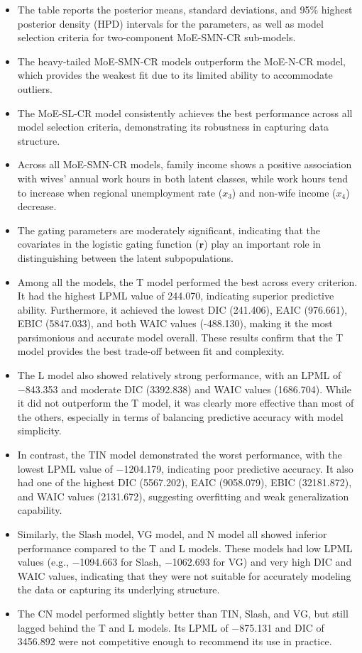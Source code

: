 \documentclass[10.5pt]{article} %
\begin{document}
\begin{itemize}
    \item The table reports the posterior means, standard deviations, and 95\% highest posterior density (HPD) intervals for the parameters, as well as model selection criteria for two-component MoE-SMN-CR sub-models.
    \item The heavy-tailed MoE-SMN-CR models outperform the MoE-N-CR model, which provides the weakest fit due to its limited ability to accommodate outliers.
    \item The MoE-SL-CR model consistently achieves the best performance across all model selection criteria, demonstrating its robustness in capturing data structure.
    \item Across all MoE-SMN-CR models, family income shows a positive association with wives' annual work hours in both latent classes, while work hours tend to increase when regional unemployment rate (\(x_3\)) and non-wife income (\(x_4\)) decrease.
    \item The gating parameters are moderately significant, indicating that the covariates in the logistic gating function (\(\mathbf{r}\)) play an important role in distinguishing between the latent subpopulations.
    \item Among all the models, the T model performed the best across every criterion. It had the highest LPML value of 244.070, indicating superior predictive ability. Furthermore, it achieved the lowest DIC (241.406), EAIC (976.661), EBIC (5847.033), and both WAIC values (-488.130), making it the most parsimonious and accurate model overall. These results confirm that the T model provides the best trade-off between fit and complexity.
    \item The L model also showed relatively strong performance, with an LPML of −843.353 and moderate DIC (3392.838) and WAIC values (1686.704). While it did not outperform the T model, it was clearly more effective than most of the others, especially in terms of balancing predictive accuracy with model simplicity.
    \item In contrast, the TIN model demonstrated the worst performance, with the lowest LPML value of −1204.179, indicating poor predictive accuracy. It also had one of the highest DIC (5567.202), EAIC (9058.079), EBIC (32181.872), and WAIC values (2131.672), suggesting overfitting and weak generalization capability.
    \item Similarly, the Slash model, VG model, and N model all showed inferior performance compared to the T and L models. These models had low LPML values (e.g., −1094.663 for Slash, −1062.693 for VG) and very high DIC and WAIC values, indicating that they were not suitable for accurately modeling the data or capturing its underlying structure.
    \item The CN model performed slightly better than TIN, Slash, and VG, but still lagged behind the T and L models. Its LPML of −875.131 and DIC of 3456.892 were not competitive enough to recommend its use in practice.

\end{itemize}
\end{document}
